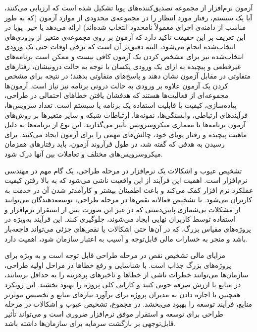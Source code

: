 آزمون نرم‌افزار از مجموعه تصدیق‌کننده‌های پویا تشکیل شده است که ارزیابی می‌کنند، آیا یک سیستم، رفتار مورد انتظار را در مجموعه‌ی محدودی از موارد آزمون (که به طور مناسب از دامنه‌ی اجرای معمولاً نامحدود انتخاب شده‌اند) ارائه می‌دهد یا خیر. پویا در این تعریف بر این حقیقت تاکید دارد که آزمون بر روی مجموعه‌ی متغیر از ورودی‌های انتخاب‌شده انجام می‌شود،‌ البته دقیق‌تر آن است که برخی اوقات حتی یک ورودی انتخاب‌شده نیز برای مشخص کردن یک آزمون کافی نیست و ممکن است برنامه‌های غیرقطعی و پیچیده به ازای یک ورودی یکسان با توجه به حالت درونیشان، رفتارهای متفاوتی در مقابل آزمون نشان دهند و پاسخ‌های متفاوتی بدهند؛ در نتیجه برای مشخص کردن یک آزمون علاوه بر ورودی به حالت درونی برنامه نیز نیاز است. آزمون‌ها مجموعه‌ای از فعالیت‌ها هستند که هدفشان یافتن خطاهای احتمالی در طراحی، پیاده‌سازی، کیفیت یا قابلیت استفاده یک برنامه یا سیستم است. تعداد سرویس‌ها، فرآیندهای ارتباطی، وابستگی‌ها، نمونه‌ها، ارتباطات شبکه و سایر متغیرها بر روش‌های آزمون برنامه‌ها با معماری میکروسرویس تأثیر می‌گذارند. این نوع از برنامه‌ها به دلیل ماهیت پیچیده و رفتار پویای خود، چالش‌های مهمی را برای آزمون ایجاد می‌کنند. برای رسیدن به هدفی که گفته شد، در طول فرآروند آزمون، باید رفتارهای همزمان میکروسرویس‌های مختلف و تعاملات بین آنها درک شود. 


تشخیص عیوب و اشکالات یک نرم‌افزار در مرحله طراحی، یک گام مهم در مهندسی نرم‌افزار است. اهمیت این فرآیند از این واقعیت ناشی می‌شود که به بالا رفتن کیفیت عملکرد نرم افزار کمک می‌کند و باعث اطمینان بیشتر و کارآمدتر شدن آن در خدمت به کاربران می‌شود. با تشخیص فعالانه نقص‌ها در مرحله طراحی، توسعه‌دهندگان می‌توانند از مشکلات بی‌شماری پایین‌دستی که در غیر این صورت پس از استقرار نرم‌افزار و استفاده توسط کاربران نهایی ایجاد می‌شوند، جلوگیری کنند. این فرآیند به‌ویژه در پروژه‌های مقیاس بزرگ، که در آن‌ها حتی اشکالات یا نقص‌های جزئی می‌تواند فاجعه‌بار باشد و منجر به خسارات مالی قابل‌توجه و آسیب به اعتبار سازمان شود، اهمیت دارد.

مزایای مالی تشخیص نقص در مرحله طراحی قابل توجه است و به ویژه برای پروژه‌های بزرگ جذاب است. با شناسایی و رفع خطاها در مراحل اولیه طراحی، سازمان‌ها می‌توانند خطرات ناشی از خطاها و تاخیرهای پرهزینه را به حداقل برسانند، در منابع با ارزش صرفه جویی کنند و کارایی کلی پروژه را بهبود بخشند. این رویکرد همچنین با اجازه دادن به مدیران پروژه برای برآورد نیازهای منابع و تخصیص موثرتر منابع، فرآیند توسعه را بهبود می‌بخشد. در مجموع، تشخیص عیوب و اشکالات در مرحله طراحی برای توسعه و استقرار موفق نرم‌افزار ضروری است و می‌تواند تأثیر قابل‌توجهی بر بازگشت سرمایه برای سازمان‌ها داشته باشد.

